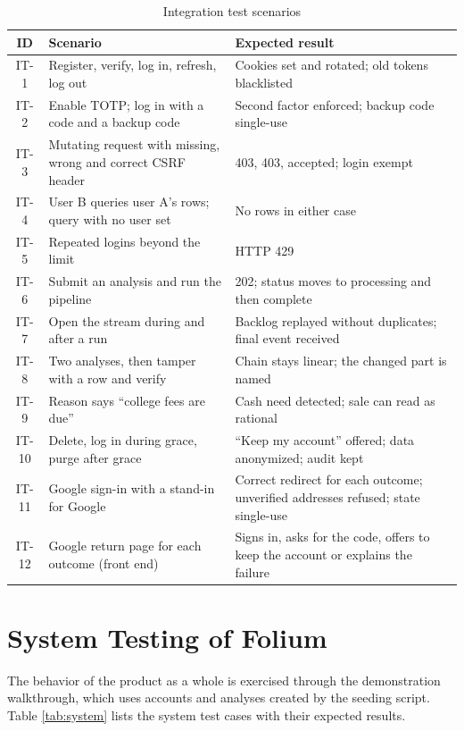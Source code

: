 \begin{table}[H]
\centering
\small
\begin{tabularx}{\textwidth}{|c|P{5cm}|L|}
\hline
\textbf{ID} & \textbf{Scenario} & \textbf{Expected result} \\
\hline
IT-1 & Register, verify, log in, refresh, log out & Cookies set and rotated; old tokens blacklisted \\
\hline
IT-2 & Enable TOTP; log in with a code and a backup code & Second factor enforced; backup code single-use \\
\hline
IT-3 & Mutating request with missing, wrong and correct CSRF header & 403, 403, accepted; login exempt \\
\hline
IT-4 & User B queries user A's rows; query with no user set & No rows in either case \\
\hline
IT-5 & Repeated logins beyond the limit & HTTP 429 \\
\hline
IT-6 & Submit an analysis and run the pipeline & 202; status moves to processing and then complete \\
\hline
IT-7 & Open the stream during and after a run & Backlog replayed without duplicates; final event received \\
\hline
IT-8 & Two analyses, then tamper with a row and verify & Chain stays linear; the changed part is named \\
\hline
IT-9 & Reason says ``college fees are due'' & Cash need detected; sale can read as rational \\
\hline
IT-10 & Delete, log in during grace, purge after grace & ``Keep my account'' offered; data anonymized; audit kept \\
\hline
IT-11 & Google sign-in with a stand-in for Google & Correct redirect for each outcome; unverified addresses refused; state single-use \\
\hline
IT-12 & Google return page for each outcome (front end) & Signs in, asks for the code, offers to keep the account or explains the failure \\
\hline
\end{tabularx}
\caption{Integration test scenarios}
\label{tab:integration}
\end{table}

\section{System Testing of Folium}
The behavior of the product as a whole is exercised through the demonstration walkthrough, which uses accounts and analyses created by the seeding script. Table \ref{tab:system} lists the system test cases with their expected results.

